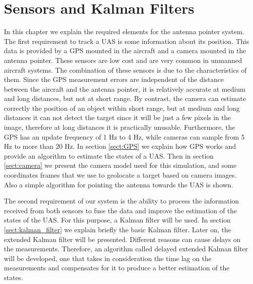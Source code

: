 \chapter{Sensors and Kalman Filters}{\label{ch:Sensors}}
In this chapter we explain the required elements for the antenna pointer system. The first requirement to track a UAS is some information about its position. This data is provided by a GPS mounted in the aircraft and a camera mounted in the antenna pointer. These sensors are low cost and are very common in unmanned aircraft systems. The combination of these sensors is due to the characteristics of them. Since the GPS measurement errors are independent of the distance between the aircraft and the antenna pointer, it is relatively accurate at medium and long distances, but not at short range. By contrast, the camera can estimate correctly the position of an object within short range, but at medium and long distances it can not detect the target since it will be just a few pixels in the image, therefore at long distances it is practically unusable. Furthermore, the GPS has an update frequency of 1 Hz to 4 Hz, while cameras can sample from 5 Hz to more than 20 Hz. In section \ref{sect:GPS} we explain how GPS works and provide an algorithm to estimate the states of a UAS. Then in section \ref{sect:camera} we present the camera model used for this simulation, and some coordinates frames that we use to geolocate a target based on camera images. Also a simple algorithm for pointing the antenna towards the UAS is shown.

The second requirement of our system is the ability to process the information received from both sensors to fuse the data and improve the estimation of the states of the UAS. For this purpose, a Kalman filter will be used. In section \ref{sect:kalman_filter} we explain briefly the basic Kalman filter. Later on, the extended Kalman filter will be presented. Different reasons can cause delays on the measurements. Therefore, an algorithm called delayed extended Kalman filter will be developed, one that takes in consideration the time lag on the measurements and compensates for it to produce a better estimation of the states.

\pagebreak
